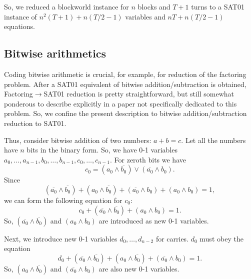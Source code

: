 \documentclass[11pt]{article}
\begin{document}
So, we reduced a blockworld instance for $n$ blocks and $T+1$ turns to a SAT01 instance of $n^2 (T+1)+n(T/2-1)$ variables and $nT+n(T/2-1)$ equations.

\subsection{Bitwise arithmetics}
Coding bitwise arithmetic is crucial, for example, for reduction of the factoring problem. After a SAT01 equivalent of bitwise addition/subtraction is obtained, Factoring$\to$SAT01 reduction is pretty straightforward, but still somewhat ponderous to describe explicitly in a paper not specifically dedicated to this problem. So, we confine the present description to bitwise addition/subtraction reduction to SAT01.

Thus, consider bitwise addition of two numbers: $a+b=c$. Let all the numbers have $n$ bits in the binary form. So, we have 0-1 variables $a_0, \ldots ,a_{n-1}, b_0, \ldots ,b_{n-1}, c_0, \ldots ,c_{n-1}$. For zeroth bits we have
\[ c_0 = (a_0 \land \overline{b_0}) \lor (\overline{a_0} \land b_0). \]
Since
\[ (\overline{a_0} \land \overline{b_0}) + (a_0 \land \overline{b_0}) + (\overline{a_0} \land b_0) + (a_0 \land b_0) =1, \]
we can form the following equation for $c_0$:
\begin{equation}
\label{eq:bac02sat01}
c_0 + (\overline{a_0} \land \overline{b_0}) + (a_0 \land b_0) =1.
\end{equation}
So, $(\overline{a_0} \land \overline{b_0})$ and $(a_0 \land b_0)$ are introduced as new 0-1 variables.

Next, we introduce new 0-1 variables $d_0, \ldots ,d_{n-2}$ for carries. $d_0$ must obey the equation
\begin{equation}
\label{eq:bad02sat01}
d_0 + (\overline{a_0} \land \overline{b_0}) + (a_0 \land \overline{b_0}) + (\overline{a_0} \land b_0) =1.
\end{equation}
So, $(a_0 \land \overline{b_0})$ and $(\overline{a_0} \land b_0)$ are also new 0-1 variables.
\end{document}
